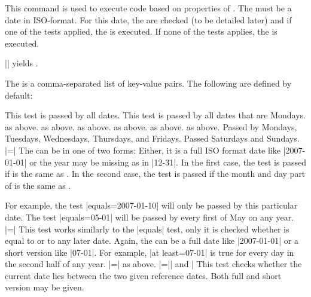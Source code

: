 \begin{command}{\pgfcalendarifdate{}}
  \label{pgfcalendarifdate}
  This command is used to execute code based on properties of
  . The  must be a date in ISO-format. For
  this date, the  are checked (to be detailed later)
  and if one of the tests applied, the  is
  executed. If none of the tests applies, the  is
  executed.

  \example ||
  yields \texttt{}.

  The  is a comma-separated list of key-value
  pairs. The following are defined by default:
  \begin{itemize}
   This test is passed by all dates.
   This test is passed by all dates that
  are Mondays.
   as above.
   as above.
   as above.
   as above.
   as above.
   as above.
   Passed by Mondays, Tuesdays,
  Wednesdays, Thursdays, and Fridays.
   Passed Saturdays and Sundays. 
  |=| The 
  can be in one of two forms: Either, it is a full ISO format date
  like |2007-01-01| or the year may be missing as in |12-31|. In the
  first case, the test is passed if  is the same as
  . In the second case, the test is passed if the
  month and day part of  is the same as .

  For example, the test |equals=2007-01-10| will only be passed by this
  particular date. The test |equals=05-01| will be passed by every first
  of May on any year.
  |=| This test works
  similarly to the |equals| test, only it is checked whether
   is equal to  or to any later
  date. Again, the  can be a full date like
  |2007-01-01| or a short version like |07-01|. For example,
  |at least=07-01| is true for every day in the second half of any
  year.
  |=| as above.
  |=|| and | This test checks whether the current date lies between
  the two given reference dates. Both full and short version may be
  given.


\end{itemize}
\end{command}
